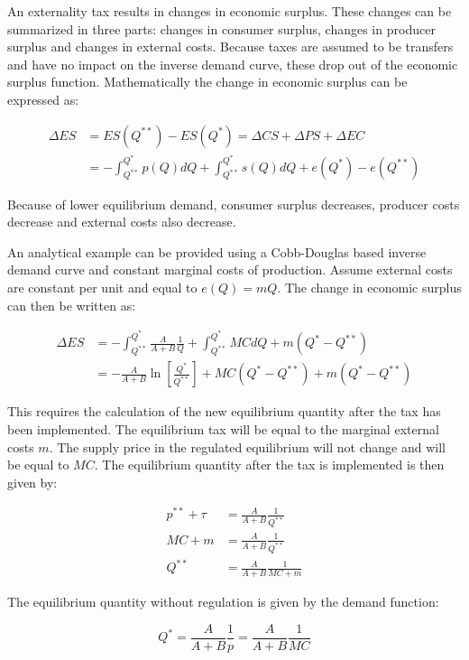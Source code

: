\documentclass[
]{book}
\begin{document}
An externality tax results in changes in economic surplus. These changes can be summarized in three parts: changes in consumer surplus, changes in producer surplus and changes in external costs. Because taxes are assumed to be transfers and have no impact on the inverse demand curve, these drop out of the economic surplus function. Mathematically the change in economic surplus can be expressed as:

\begin{align}
\Delta ES &= ES (Q^{**}) - ES(Q^*) = \Delta CS + \Delta PS + \Delta EC \\
 &= -\int_{Q^{**}}^{Q^*} p(Q)dQ + \int_{Q^{**}}^{Q^*} s(Q)dQ +e(Q^*) - e(Q^{**})
\end{align}

Because of lower equilibrium demand, consumer surplus decreases, producer costs decrease and external costs also decrease.

An analytical example can be provided using a Cobb-Douglas based inverse demand curve and constant marginal costs of production. Assume external costs are constant per unit and equal to \(e(Q)=mQ\). The change in economic surplus can then be written as:

\begin{align}
\Delta ES &= -\int_{Q^{**}}^{Q^*} \frac{A}{A+B} \frac{1}{Q} +\int_{Q^{**}}^{Q^*} MCdQ + m(Q^* - Q^{**}) \\
&=-\frac{A}{A+B} \ln\left[\frac{Q^*}{Q^{**}} \right] +MC (Q^* - Q^{**}) + m(Q^* - Q^{**})
\end{align}

This requires the calculation of the new equilibrium quantity after the tax has been implemented. The equilibrium tax will be equal to the marginal external costs \(m\). The supply price in the regulated equilibrium will not change and will be equal to \(MC\). The equilibrium quantity after the tax is implemented is then given by:

\begin{align}
p^{**} + \tau &= \frac{A}{A+B} \frac{1}{Q^{**}} \\
MC + m &= \frac{A}{A+B} \frac{1}{Q^{**}} \\
Q^{**} &= \frac{A}{A+B} \frac{1}{MC + m}
\end{align}

The equilibrium quantity without regulation is given by the demand function:

\begin{equation}
Q^* = \frac{A}{A+B} \frac{1}{p} = \frac{A}{A+B} \frac{1} {MC}
\end{equation}
\end{document}
